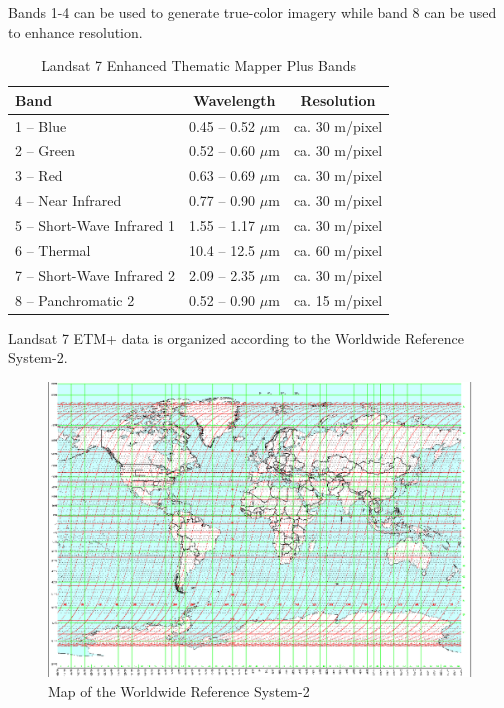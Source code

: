 Bands 1-4 can be used to generate true-color imagery while band 8 can be used to enhance resolution.

\begin{table}[h!]
  \begin{center}
    \begin{tabular}{ l | c | c }
      \toprule
      \textbf{Band} & \textbf{Wavelength} & \textbf{Resolution} \\ \midrule
      1 -- Blue                  & 0.45 -- 0.52 $\mu$m & ca. 30 m/pixel \\
      2 -- Green                 & 0.52 -- 0.60 $\mu$m & ca. 30 m/pixel \\
      3 -- Red                   & 0.63 -- 0.69 $\mu$m & ca. 30 m/pixel \\
      4 -- Near Infrared         & 0.77 -- 0.90 $\mu$m & ca. 30 m/pixel \\
      5 -- Short-Wave Infrared 1 & 1.55 -- 1.17 $\mu$m & ca. 30 m/pixel \\
      6 -- Thermal               & 10.4 -- 12.5 $\mu$m & ca. 60 m/pixel \\
      7 -- Short-Wave Infrared 2 & 2.09 -- 2.35 $\mu$m & ca. 30 m/pixel \\
      8 -- Panchromatic 2        & 0.52 -- 0.90 $\mu$m & ca. 15 m/pixel \\
      \bottomrule
    \end{tabular}
    \caption{Landsat 7 Enhanced Thematic Mapper Plus Bands}
  \end{center}
\end{table}

Landsat 7 ETM+ data is organized according to the Worldwide Reference System-2.

\begin{figure}[h!]
  \centering
  \includegraphics[width=140mm]{eps/landsat_7_wrs2.eps}
  \caption{Map of the Worldwide Reference System-2}
\end{figure}

